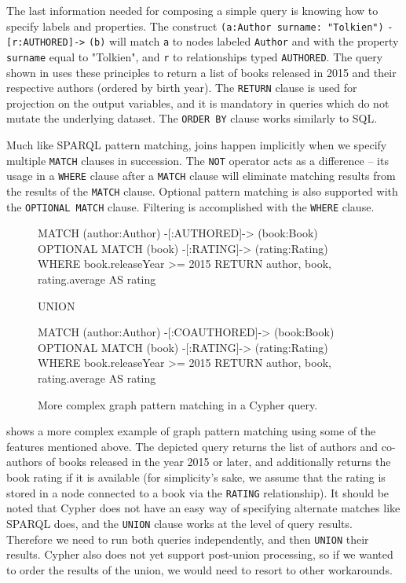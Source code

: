 The last information needed for composing a simple query is knowing how to specify labels and properties.
The construct \texttt{(a:Author {surname: "Tolkien"})} \texttt{-[r:AUTHORED]->} \texttt{(b)} will match \texttt{a} to nodes labeled \texttt{Author} and with the property \texttt{surname} equal to "Tolkien", and \texttt{r} to relationships typed \texttt{AUTHORED}.
The query shown in  uses these principles to return a list of books released in 2015 and their respective authors (ordered by birth year).
The \texttt{RETURN} clause is used for projection on the output variables, and it is mandatory in queries which do not mutate the underlying dataset.
The \texttt{ORDER BY} clause works similarly to SQL.

Much like SPARQL pattern matching, joins happen implicitly when we specify multiple \texttt{MATCH} clauses in succession.
The \texttt{NOT} operator acts as a difference -- its usage in a \texttt{WHERE} clause after a \texttt{MATCH} clause will eliminate matching results from the results of the \texttt{MATCH} clause.
Optional pattern matching is also supported with the \texttt{OPTIONAL MATCH} clause.
Filtering is accomplished with the \texttt{WHERE} clause.

\begin{figure}[ht]
\begin{code}[]
MATCH (author:Author) -[:AUTHORED]-> (book:Book)
OPTIONAL MATCH (book) -[:RATING]-> (rating:Rating)
WHERE book.releaseYear >= 2015
RETURN author, book, rating.average AS rating

UNION

MATCH (author:Author) -[:COAUTHORED]-> (book:Book)
OPTIONAL MATCH (book) -[:RATING]-> (rating:Rating)
WHERE book.releaseYear >= 2015
RETURN author, book, rating.average AS rating
\end{code}
\caption{More complex graph pattern matching in a Cypher query.}
\label{fig:cypherpattern}
\end{figure}

 shows a more complex example of graph pattern matching using some of the features mentioned above.
The depicted query returns the list of authors and co-authors of books released in the year 2015 or later, and additionally returns the book rating if it is available (for simplicity's sake, we assume that the rating is stored in a node connected to a book via the \texttt{RATING} relationship).
It should be noted that Cypher does not have an easy way of specifying alternate matches like SPARQL does, and the \texttt{UNION} clause works at the level of query results.
Therefore we need to run both queries independently, and then \texttt{UNION} their results.
Cypher also does not yet support post-union processing, so if we wanted to order the results of the union, we would need to resort to other workarounds.

